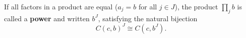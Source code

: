 If all factors in a product are equal ($a_j = b$ for all $j \in J$), the product $\prod_j b$ is called a \textbf{power} and written $b^J$, satisfying the natural bijection
$$C(c, b)^J \cong C(c, b^J).$$